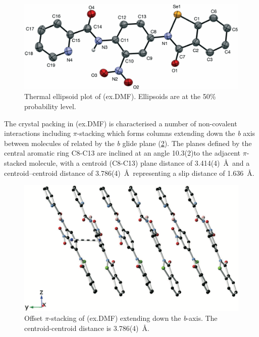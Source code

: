 \begin{figure}
    \centering
    \includegraphics[width=0.8\linewidth]{Figures/ebs-nitroamide-2py-dmf-xtal.png}
    \caption{Thermal ellipsoid plot of (ex.DMF). Ellipsoids are at the 50\% probability level.}
    \label{fig:ebs-nitroamide-2py-dmf-xtal}
\end{figure}

The crystal packing in (ex.DMF) is characterised a number of non-covalent interactions including $\pi$-stacking which forms columns extending down the \emph{b} axis between molecules of  related by the \emph{b} glide plane (\ref{fig:ebs-nitroamide-2py-packing}). 
The planes defined by the central aromatic ring C8-C13 are inclined at an angle 10.3(2)\degree to the adjacent $\pi$-stacked molecule, with a centroid (C8-C13) plane distance of 3.414(4)~\AA~and a centroid–centroid distance of 3.786(4)~\AA~representing a slip distance of 1.636~\AA.

\begin{figure}
    \centering
    \includegraphics[width=0.8\linewidth]{Figures/ebs-nitroamide-2py-packing.png}
    \caption{Offset $\pi$-stacking of (ex.DMF) extending down the \emph{b}-axis. The centroid-centroid distance is 3.786(4)~\AA.}
    \label{fig:ebs-nitroamide-2py-packing}
\end{figure}

